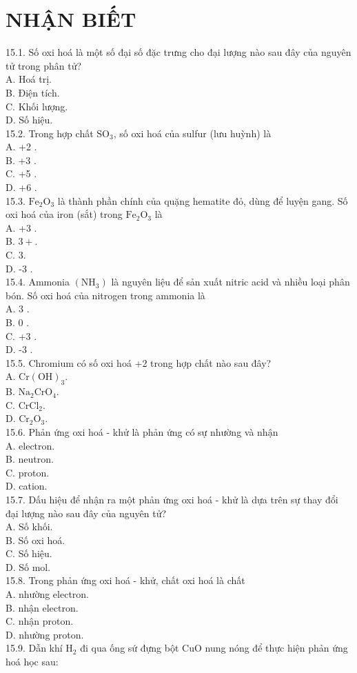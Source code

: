 \documentclass[10pt]{article}
\begin{document}
\section*{NHẬN BIẾT}
15.1. Số oxi hoá là một số đại số đặc trưng cho đại lượng nào sau đây của nguyên tử trong phân tử?\\
A. Hoá trị.\\
B. Điện tích.\\
C. Khối lượng.\\
D. Số hiệu.\\
15.2. Trong hợp chất $\mathrm{SO}_{3}$, số oxi hoá của sulfur (lưu huỳnh) là\\
A. +2 .\\
B. +3 .\\
C. +5 .\\
D. +6 .\\
15.3. $\mathrm{Fe}_{2} \mathrm{O}_{3}$ là thành phần chính của quặng hematite đỏ, dùng để luyện gang. Số oxi hoá của iron (sắt) trong $\mathrm{Fe}_{2} \mathrm{O}_{3}$ là\\
A. +3 .\\
B. $3+$.\\
C. 3.\\
D. -3 .\\
15.4. Ammonia $\left(\mathrm{NH}_{3}\right)$ là nguyên liệu để sản xuất nitric acid và nhiều loại phân bón. Số oxi hoá của nitrogen trong ammonia là\\
A. 3 .\\
B. 0 .\\
C. +3 .\\
D. -3 .\\
15.5. Chromium có số oxi hoá +2 trong hợp chất nào sau đây?\\
A. $\mathrm{Cr}(\mathrm{OH})_{3}$.\\
B. $\mathrm{Na}_{2} \mathrm{CrO}_{4}$.\\
C. $\mathrm{CrCl}_{2}$.\\
D. $\mathrm{Cr}_{2} \mathrm{O}_{3}$.\\
15.6. Phản ứng oxi hoá - khử là phản ứng có sự nhường và nhận\\
A. electron.\\
B. neutron.\\
C. proton.\\
D. cation.\\
15.7. Dấu hiệu để nhận ra một phản ứng oxi hoá - khử là dựa trên sự thay đổi đại lượng nào sau đây của nguyên tử?\\
A. Số khối.\\
B. Số oxi hoá.\\
C. Số hiệu.\\
D. Số mol.\\
15.8. Trong phản ứng oxi hoá - khử, chất oxi hoá là chất\\
A. nhường electron.\\
B. nhận electron.\\
C. nhận proton.\\
D. nhường proton.\\
15.9. Dẫn khí $\mathrm{H}_{2}$ đi qua ống sứ đựng bột CuO nung nóng để thực hiện phản ứng hoá học sau:
\end{document}
